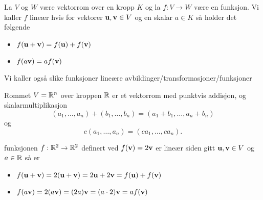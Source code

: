 \begin{definisjon}\label{Def:LinAvb}
    La $V$ og $W$ være vektorrom over en kropp $K$ og la $f: V\to W$ være en funksjon. Vi kaller $f$ lineær hvis for vektorer $\textbf{u},\textbf{v}\in V$ og en skalar $a\in K$ så holder det følgende
    \begin{itemize}
    \item $f(\textbf{u}+\textbf{v}) = f(\textbf{u})+f(\textbf{v})$
    \item $f(a\textbf{v}) = af(\textbf{v})$
    \end{itemize}
    Vi kaller også slike funksjoner lineære avbildinger/transformasjoner/funksjoner
\end{definisjon}

\begin{eksempel}\label{Ex:EukVRom}
    Rommet $V = \mathbb{R}^n$ over kroppen $\mathbb{R}$ er et vektorrom med punktvis addisjon, og skalarmultiplikasjon
    \[(a_1,\dots,a_n)+(b_1,\dots,b_n) = (a_1+b_1,\dots,a_n+b_n)\]
    og
    \[c(a_1,\dots,a_n)=(ca_1,\dots,ca_n).\]
\end{eksempel}

\begin{eksempel}\label{Ex:label}
    funksjonen $f:\mathbb{R}^2\to\mathbb{R}^2$ definert ved $f(\textbf{v}) = 2\textbf{v}$ er
    lineær siden gitt $\textbf{u},\textbf{v}\in V$ og $a\in\mathbb{R}$ så er
    \begin{itemize}
        \item $f(\textbf{u}+\textbf{v}) = 2(\textbf{u}+\textbf{v}) = 2\textbf{u}+2\textbf{v} = f(\textbf{u})+f(\textbf{v})$
        \item $f(a\textbf{v}) = 2(a\textbf{v}) = (2a)\textbf{v} = (a\cdot2)\textbf{v} = af(\textbf{v})$
    \end{itemize}
\end{eksempel}

